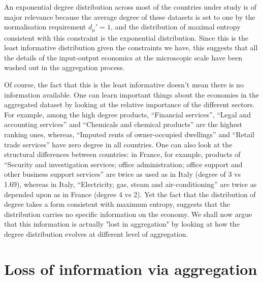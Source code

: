 An exponential degree distribution across most of the countries under
study is of major relevance because the average degree of these
datasets is set to one by the normalisation requirement $d_\mu'=1$,
and the distribution of maximal entropy consistent with this
constraint is the exponential distribution. Since this is the least
informative distribution given the constraints we have, this suggests
that all the details of the input-output economics at the microscopic scale
have been washed out in the aggregation process.

Of course, the fact that this is the least informative doesn't mean
there is no information available. One can learn important things
about the economies in the aggregated dataset by looking at the relative 
importance of the different sectors. For example, among the
high degree products, ``Financial services'', ``Legal and accounting
services'' and ``Chemicals and chemical products'' are the highest
ranking ones, whereas, ``Imputed rents of
owner-occupied dwellings'' and ``Retail trade services'' have zero
degree in all countries. One can also look at the structural
differences between countries: in France, for example, products of
``Security and investigation services; office administration; office
support and other business support services'' are twice as used as in
Italy (degree of 3 vs 1.69), whereas in Italy,
``Electricity, gas, steam and air-conditioning'' are twice as depended
upon as in France (degree 4 vs 2). Yet the fact that the distribution of
degree takes a form consistent with maximum entropy, suggests that
the distribution carries no specific information on the economy. 
We shall now argue that this information is actually "lost in aggregation"
by looking at how the degree distribution evolves at different level of aggregation.


\section{Loss of information via aggregation}
\label{sec:aggreg} 

